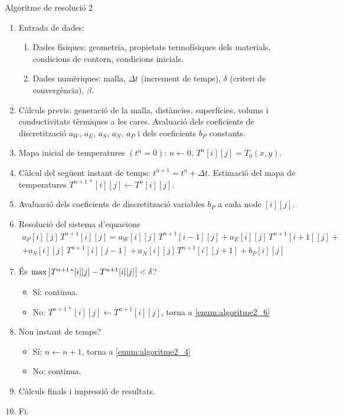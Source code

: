 \begin{algorithm}[h]
	\caption{Algoritme de resolució 2}
	\label{algorithm:algoritme_resolucio_2}
	\begin{algorithmic}[0]
		\State 
		\begin{enumerate}[label=\textbf{\arabic*}]
			\item Entrada de dades:
			\begin{enumerate}[label=\textbf{1.\arabic*}]
				\item Dades físiques: geometria, propietats termofísiques dels materials, condicions de contorn, condicions inicials.
				\item Dades numèriques: malla, $\Delta t$ (increment de temps), $\delta$ (criteri de convergència), $\beta$.
			\end{enumerate}
			\item Càlculs previs: generació de la malla, distàncies, superfícies, volums i conductivitats tèrmiques a les cares. Avaluació dels coeficients de discretització $a_W, \, a_E, \, a_S, \, a_N, \, a_P$ i dels coeficients $b_P$ constants.
			\item Mapa inicial de temperatures $(t^n = 0)$: $n \gets 0$, $T^n[i][j] = T_0(x,y)$.
			\item Càlcul del següent instant de temps: $t^{n+1} = t^n + \Delta t$. Estimació del mapa de temperatures $T^{n+1 \, \ast}[i][j] \gets T^n[i][j]$. \label{enum:algoritme2_4}
			\item Avaluació dels coeficients de discretització variables $b_P$ a cada node $[i][j]$. \label{enum:algoritme2_5}
			\item Resolució del sistema d'equacions \label{enum:algoritme2_6}
			\vspace*{-3mm}
			\begin{multline*}
				a_P[i][j] \, T^{n+1}[i][j] =  
				a_W[i][j] \, T^{n+1}[i-1][j] + 
				a_E[i][j] \, T^{n+1}[i+1][j] + \\ +
				a_S[i][j] \, T^{n+1}[i][j-1] + 
				a_N[i][j] \, T^{n+1}[i][j+1] + 
				b_P[i][j]
			\end{multline*}
			\item És $\max{\abs{T^{n+1 \, \ast}[i][j] - T^{n+1}[i][j]}} < \delta$? \label{enum:algoritme2_7}
			\begin{itemize}
				\item Sí: continua.
				\item No: $T^{n+1 \, \ast}[i][j] \gets T^{n+1}[i][j]$, torna a \ref{enum:algoritme2_6}
			\end{itemize}
			\item Nou instant de temps?
			\begin{itemize}
				\item Sí: $n \gets n + 1$, torna a \ref{enum:algoritme2_4}
				\item No: continua.
			\end{itemize}
			\item Càlculs finals i impressió de resultats.
			\item Fi.
		\end{enumerate}
	\end{algorithmic}
\end{algorithm}

